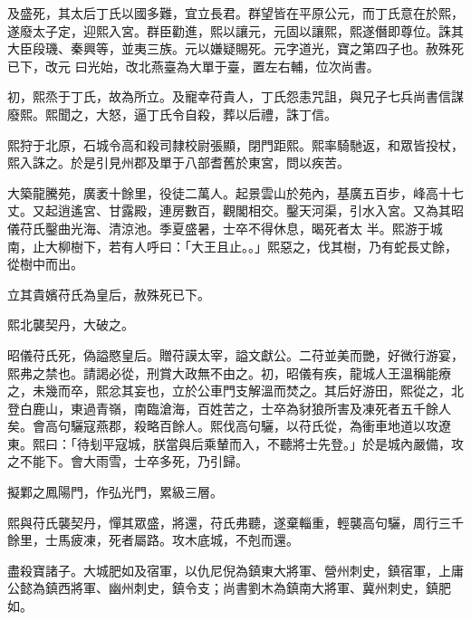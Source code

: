 \begin{pinyinscope}
 及盛死，其太后丁氏以國多難，宜立長君。群望皆在平原公元，而丁氏意在於熙，遂廢太子定，迎熙入宮。群臣勸進，熙以讓元，元固以讓熙，熙遂僭即尊位。誅其大臣段璣、秦興等，並夷三族。元以嫌疑賜死。元字道光，寶之第四子也。赦殊死已下，改元
 曰光始，改北燕臺為大單于臺，置左右輔，位次尚書。



 初，熙烝于丁氏，故為所立。及寵幸苻貴人，丁氏怨恚咒詛，與兄子七兵尚書信謀廢熙。熙聞之，大怒，逼丁氏令自殺，葬以后禮，誅丁信。



 熙狩于北原，石城令高和殺司隸校尉張顯，閉門距熙。熙率騎馳返，和眾皆投杖，熙入誅之。於是引見州郡及單于八部耆舊於東宮，問以疾苦。



 大築龍騰苑，廣袤十餘里，役徒二萬人。起景雲山於苑內，基廣五百步，峰高十七丈。又起逍遙宮、甘露殿，連房數百，觀閣相交。鑿天河渠，引水入宮。又為其昭儀苻氏鑿曲光海、清涼池。季夏盛暑，士卒不得休息，暍死者太
 半。熙游于城南，止大柳樹下，若有人呼曰：「大王且止。。」熙惡之，伐其樹，乃有蛇長丈餘，從樹中而出。



 立其貴嬪苻氏為皇后，赦殊死已下。



 熙北襲契丹，大破之。



 昭儀苻氏死，偽謚愍皇后。贈苻謨太宰，謚文獻公。二苻並美而艷，好微行游宴，熙弗之禁也。請謁必從，刑賞大政無不由之。初，昭儀有疾，龍城人王溫稱能療之，未幾而卒，熙忿其妄也，立於公車門支解溫而焚之。其后好游田，熙從之，北登白鹿山，東過青嶺，南臨滄海，百姓苦之，士卒為豺狼所害及凍死者五千餘人矣。會高句驪寇燕郡，殺略百餘人。熙伐高句驪，以苻氏從，為衝車地道以攻遼
 東。熙曰：「待刬平寇城，朕當與后乘輦而入，不聽將士先登。」於是城內嚴備，攻之不能下。會大雨雪，士卒多死，乃引歸。



 擬鄴之鳳陽門，作弘光門，累級三層。



 熙與苻氏襲契丹，憚其眾盛，將還，苻氏弗聽，遂棄輜重，輕襲高句驪，周行三千餘里，士馬疲凍，死者屬路。攻木底城，不剋而還。



 盡殺寶諸子。大城肥如及宿軍，以仇尼倪為鎮東大將軍、營州刺史，鎮宿軍，上庸公懿為鎮西將軍、幽州刺史，鎮令支；尚書劉木為鎮南大將軍、冀州刺史，鎮肥如。




\end{pinyinscope}
